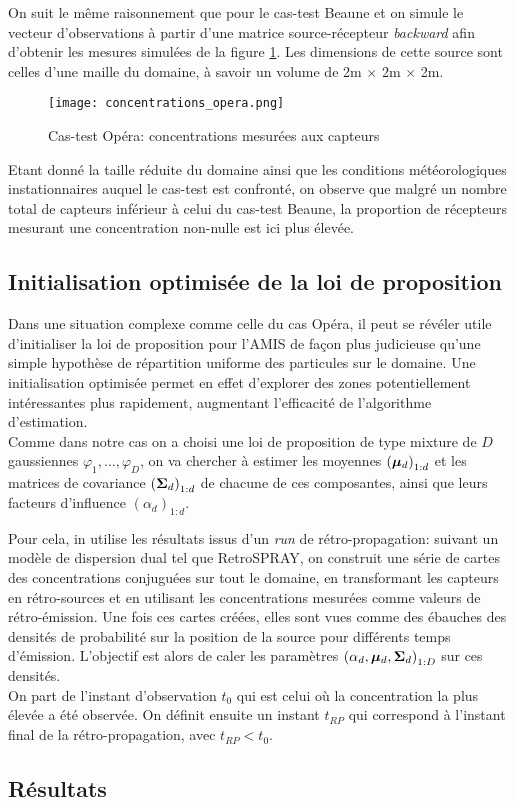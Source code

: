 On suit le même raisonnement que pour le cas-test Beaune et on simule le vecteur d'observations à partir d'une matrice source-récepteur \textit{backward} afin d'obtenir les mesures simulées de la figure \ref{fig_opera_obs}. Les dimensions de cette source sont celles d'une maille du domaine, à savoir un volume de 2m $\times$ 2m $\times$ 2m.

\begin{figure}[h!]
	\centering
	\texttt{[image: concentrations\_opera.png]}
	\caption{Cas-test Opéra: concentrations mesurées aux capteurs}
	\label{fig_opera_obs}
\end{figure}

Etant donné la taille réduite du domaine ainsi que les conditions météorologiques instationnaires auquel le cas-test est confronté, on observe que malgré un nombre total de capteurs inférieur à celui du cas-test Beaune, la proportion de récepteurs mesurant une concentration non-nulle est ici plus élevée.


\subsection{Initialisation optimisée de la loi de proposition}

Dans une situation complexe comme celle du cas Opéra, il peut se révéler utile d'initialiser la loi de proposition pour l'AMIS de façon plus judicieuse qu'une simple hypothèse de répartition uniforme des particules sur le domaine. Une initialisation optimisée permet en effet d'explorer des zones potentiellement intéressantes plus rapidement, augmentant l'efficacité de l'algorithme d'estimation. \\

Comme dans notre cas on a choisi une loi de proposition de type mixture de $D$ gaussiennes $\varphi_1, \dots, \varphi_D$, on va chercher à estimer les moyennes $\left({\bm{\mu}}_d\right)_{1:d}$ et les matrices de covariance $\left({\bm{\Sigma}}_d\right)_{1:d}$ de chacune de ces composantes, ainsi que leurs facteurs d'influence $\left(\alpha_d\right)_{1:d}$. 

Pour cela, in utilise les résultats issus d'un \textit{run} de rétro-propagation: suivant un modèle de dispersion dual tel que RetroSPRAY, on construit une série de cartes des concentrations conjuguées sur tout le domaine, en transformant les capteurs en rétro-sources et en utilisant les concentrations mesurées comme valeurs de rétro-émission. Une fois ces cartes créées, elles sont vues comme des ébauches des densités de probabilité sur la position de la source pour différents temps d'émission. L'objectif est alors de caler les paramètres $\left(\alpha_d, {\bm{\mu}}_d,{\bm{\Sigma}}_d \right)_{1:D}$ sur ces densités.\\

On part de l'instant d'observation $t_0$ qui est celui où la concentration la plus élevée a été observée. On définit ensuite un instant $t_{RP}$ qui correspond à l'instant final de la rétro-propagation, avec $t_{RP} < t_0$.  

\subsection{Résultats}

